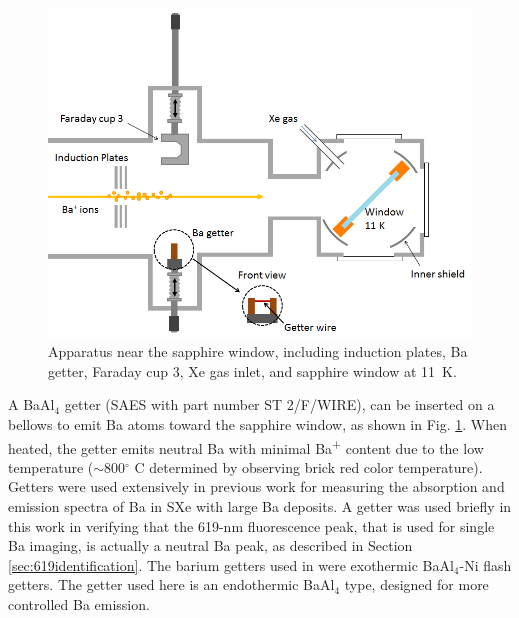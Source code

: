 \begin{figure} %
        \centering
                \includegraphics[width=.75\textwidth]{figures/window_etc_justBa_frontViewGetter.png}
                \caption{Apparatus near the sapphire window, including induction plates, Ba getter, Faraday cup 3, Xe gas inlet, and sapphire window at 11~K.}
\label{fig:endOfBeamBa}
\end{figure}

A BaAl$_{4}$ getter (SAES with part number ST 2/F/WIRE), can be inserted on a bellows to emit Ba atoms toward the sapphire window, as shown in Fig. \ref{fig:endOfBeamBa}.  When heated, the getter emits neutral Ba with minimal Ba\textsuperscript{+} content due to the low temperature ($\sim$800$^{\circ}$ C determined by observing brick red color temperature).  Getters were used extensively in previous work \cite{Brian} for measuring the absorption and emission spectra of Ba in SXe with large Ba deposits.  A getter was used briefly in this work in verifying that the 619-nm fluorescence peak, that is used for single Ba imaging, is actually a neutral Ba peak, as described in Section \ref{sec:619identification}.  The barium getters used in \cite{Brian} were exothermic BaAl$_{4}$-Ni flash getters.  The getter used here is an endothermic BaAl$_{4}$ type, designed for more controlled Ba emission.  



